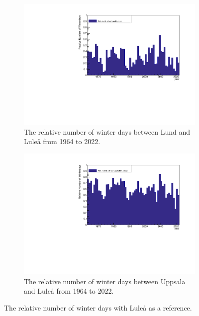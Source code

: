 \documentclass[aps,prl,groupedaddress,twocolumn]{revtex4-1}
\begin{document}
\begin{figure}[h!]
    \begin{subfigure}{0.45\textwidth}
            \includegraphics[width=\textwidth]{rel_Lund_hist.pdf}
            \caption{The relative number of winter days between Lund and Luleå from 1964 to 2022.}
            \label{fig:rel_lund}
    \end{subfigure}
    \hfill
    \begin{subfigure}{0.45\textwidth}
            \includegraphics[width=\textwidth]{rel_Uppsala_hist.pdf}
            \caption{The relative number of winter days between Uppsala and Luleå from 1964 to 2022.}
            \label{fig:rel_uppsala}
    \end{subfigure}
    \caption{The relative number of winter days with Luleå as a reference.}
    \label{fig:rel_winterdays}
\end{figure}
\end{document}
